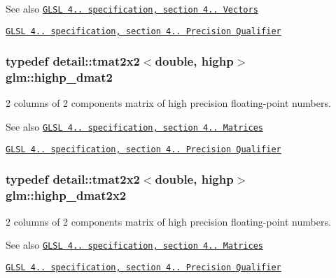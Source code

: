 \begin{DoxySeeAlso}{See also}
\href{http://www.opengl.org/registry/doc/GLSLangSpec.4.20.8.pdf}{\tt G\+L\+SL 4.. specification, section 4.. Vectors} 

\href{http://www.opengl.org/registry/doc/GLSLangSpec.4.20.8.pdf}{\tt G\+L\+SL 4.. specification, section 4.. Precision Qualifier} 
\end{DoxySeeAlso}
\subsubsection[{\texorpdfstring{highp\+\_\+dmat2}{highp_dmat2}}]{\setlength{\rightskip}{0pt plus 5cm}typedef detail\+::tmat2x2$<$double, highp$>$ {\bf glm\+::highp\+\_\+dmat2}}\hypertarget{group__core__precision_ga9b158b3b722fe991bb66f7e65f136e68}{}\label{group__core__precision_ga9b158b3b722fe991bb66f7e65f136e68}
2 columns of 2 components matrix of high precision floating-\/point numbers.

\begin{DoxySeeAlso}{See also}
\href{http://www.opengl.org/registry/doc/GLSLangSpec.4.20.8.pdf}{\tt G\+L\+SL 4.. specification, section 4.. Matrices} 

\href{http://www.opengl.org/registry/doc/GLSLangSpec.4.20.8.pdf}{\tt G\+L\+SL 4.. specification, section 4.. Precision Qualifier} 
\end{DoxySeeAlso}
\subsubsection[{\texorpdfstring{highp\+\_\+dmat2x2}{highp_dmat2x2}}]{\setlength{\rightskip}{0pt plus 5cm}typedef detail\+::tmat2x2$<$double, highp$>$ {\bf glm\+::highp\+\_\+dmat2x2}}\hypertarget{group__core__precision_gaa5e35f6570d394c1cd34f411a473220c}{}\label{group__core__precision_gaa5e35f6570d394c1cd34f411a473220c}
2 columns of 2 components matrix of high precision floating-\/point numbers.

\begin{DoxySeeAlso}{See also}
\href{http://www.opengl.org/registry/doc/GLSLangSpec.4.20.8.pdf}{\tt G\+L\+SL 4.. specification, section 4.. Matrices} 

\href{http://www.opengl.org/registry/doc/GLSLangSpec.4.20.8.pdf}{\tt G\+L\+SL 4.. specification, section 4.. Precision Qualifier} 
\end{DoxySeeAlso}
